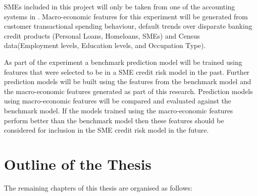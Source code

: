 SMEs included in this project will only be taken from one of the accounting systems in \subjectname. Macro-economic features for this experiment will be generated from customer transactional spending behaviour, default trends over disparate banking credit products (Personal Loans, Homeloans, SMEs) and Census data(Employment levels, Education levels, and Occupation Type). 

As part of the experiment a benchmark prediction model will be trained using features that were selected to be in a SME credit risk model in the past. Further prediction models will be built using the features from the benchmark model and the macro-economic features generated as part of this research. Prediction models using macro-economic features will be compared and evaluated against the benchmark model. If the models trained using the  macro-economic features perform better than the benchmark model then these features should be considered for inclusion in the SME credit risk model in the future. 



\section{Outline of the Thesis}
The remaining chapters of this thesis are organised as follows:


